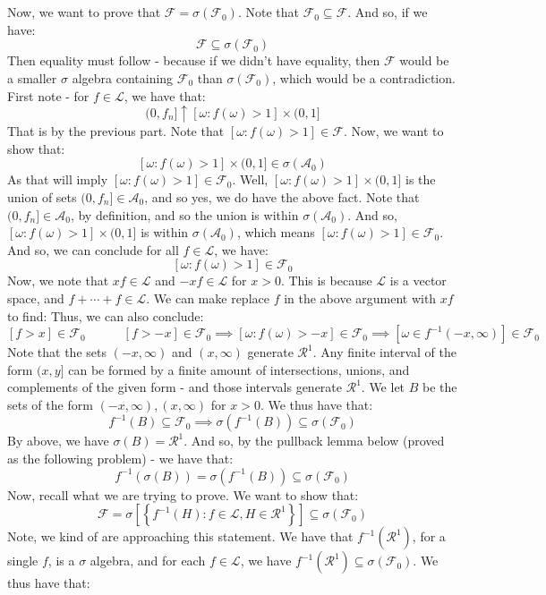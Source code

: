 \documentclass[12pt,a4paper]{article}
\newcommand{\1}[1]{\mathbbm{1}\left\{ #1 \right\}}
\newcommand{\acal}{\mathcal{A}}
\newcommand{\lcal}{\mathcal{L}}
\newcommand{\fcal}{\mathcal{F}}
\newcommand{\rcal}{\mathcal{R}}
\begin{document}
\begin{enumerate}
	\\\\
	Now, we want to prove that $\fcal = \sigma(\fcal_0)$. Note that $\fcal_0 \subseteq \fcal$. And so, if we have:
	$$
		\fcal \subseteq \sigma(\fcal_0)
	$$
	Then equality must follow - because if we didn't have equality, then $\fcal$ would be a smaller $\sigma$ algebra containing $\fcal_0$ than $\sigma(\fcal_0)$, which would be a contradiction. First note - for $f \in \lcal$, we have that:
	$$
		(0, f_n] \uparrow [\omega : f(\omega) > 1] \times (0,1]
	$$
	That is by the previous part. Note that $[\omega : f(\omega) > 1] \in \fcal$. Now, we want to show that:
	$$
		[\omega : f(\omega) > 1] \times (0,1] \in \sigma(\acal_0)
	$$
	As that will imply $[\omega : f(\omega) > 1] \in \fcal_0$. Well, $[\omega : f(\omega) > 1] \times (0,1]$ is the union of sets $(0,f_n] \in \acal_0$, and so yes, we do have the above fact. Note that $(0,f_n] \in \acal_0$, by definition, and so the union is within $\sigma(\acal_0)$. And so, $[\omega : f(\omega) > 1] \times (0,1]$ is within $\sigma(\acal_0)$, which means $[\omega : f(\omega) > 1] \in \fcal_0$. And so, we can conclude for all $f \in \lcal$, we have:
	$$
		[\omega : f(\omega) > 1] \in \fcal_0
	$$
	Now, we note that $xf \in \lcal$ and $-xf \in \lcal$ for $x > 0$. This is because $\lcal$ is a vector space, and $f + \cdots + f \in \lcal$. We can make replace $f$ in the above argument with $xf$ to find: Thus, we can also conclude:
	$$
		[f > x] \in \fcal_0 \quad\quad\quad [f > -x] \in \fcal_0 \implies
		[\omega : f(\omega) > -x] \in \fcal_0 \implies
		[\omega \in f^{-1}(-x,\infty)] \in \fcal_0
	$$
	Note that the sets $(-x, \infty)$ and $(x, \infty)$ generate $\rcal^1$. Any finite interval of the form $(x, y]$ can be formed by a finite amount of intersections, unions, and complements of the given form - and those intervals generate $\rcal^1$. We let $B$ be the sets of the form $(-x, \infty), (x, \infty)$ for $x > 0$. We thus have that:
	$$
		f^{-1}(B) \subseteq \fcal_0 \implies
		\sigma(f^{-1}(B)) \subseteq \sigma(\fcal_0)
	$$
	By above, we have $\sigma(B) = \rcal^1$. And so, by the pullback lemma below (proved as the following problem) - we have that:
	$$
		f^{-1}(\sigma(B)) = \sigma(f^{-1}(B)) \subseteq \sigma(\fcal_0)
	$$
	Now, recall what we are trying to prove. We want to show that:
	$$
		\fcal = \sigma\left[\left\{f^{-1}(H) : f \in \lcal, H \in \rcal^1\right\}\right] \subseteq \sigma(\fcal_0)
	$$
	Note, we kind of are approaching this statement. We have that $f^{-1}(\rcal^1)$, for a single $f$, is a $\sigma$ algebra, and for each $f \in \lcal$, we have $f^{-1}(\rcal^1) \subseteq \sigma(\fcal_0)$. We thus have that:

\end{enumerate}
\end{document}
